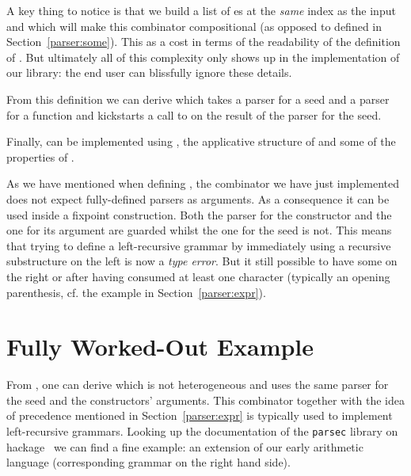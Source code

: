 
A key thing to notice is that we build a list of es at the
\emph{same} index as the input  and  which will make
this combinator compositional (as opposed to  defined in
Section~\ref{parser:some}). This as a cost in terms of the readability of
the definition of . But ultimately all of this complexity only
shows up in the implementation of our library: the end user can blissfully
ignore these details.

From this definition we can derive  which takes a parser for
a seed and a parser for a function and kickstarts a call to 
on the result of the parser for the seed.


Finally,  can be implemented using , the applicative
structure of  and some of the properties of \BOX{}.


As we have mentioned when defining , the combinator 
we have just implemented does not expect fully-defined parsers as arguments.
As a consequence it can be used inside a fixpoint construction. Both the parser
for the constructor and the one for its  argument are guarded whilst the
one for the  seed is not. This means that trying to define a left-recursive
grammar by immediately using a recursive substructure on the left is now a \emph{type
error}. But it still possible to have some on the right or after having consumed
at least one character (typically an opening parenthesis, cf. the 
example in Section~\ref{parser:expr}).

\section{Fully Worked-Out Example}\label{example:expr}

From , one can derive  which is not heterogeneous
and uses the same parser for the seed and the constructors' arguments.
This combinator together with the idea of precedence mentioned in Section~\ref{parser:expr}
is typically used to implement left-recursive grammars. Looking up the
documentation of the \texttt{parsec} library on hackage~\cite{doc:parsec}
we can find a fine example: an extension of our early arithmetic language
(corresponding grammar on the right hand side).

